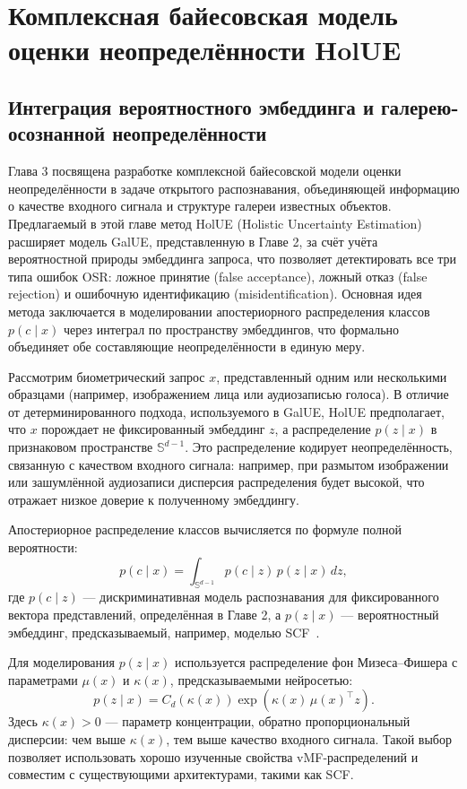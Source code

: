 \chapter{Комплексная байесовская модель оценки неопределённости HolUE}\label{ch:holue}
\section{Интеграция вероятностного эмбеддинга и галерею-осознанной неопределённости}\label{sec:holue/integration}
Глава 3 посвящена разработке комплексной байесовской модели оценки неопределённости в задаче открытого распознавания, объединяющей информацию о качестве входного сигнала и структуре галереи известных объектов.  
Предлагаемый в этой главе метод HolUE (Holistic Uncertainty Estimation) расширяет модель GalUE, представленную в Главе 2, за счёт учёта вероятностной природы эмбеддинга запроса, что позволяет детектировать все три типа ошибок OSR: ложное принятие (false acceptance), ложный отказ (false rejection) и ошибочную идентификацию (misidentification).  
Основная идея метода заключается в моделировании апостериорного распределения классов \(p(c \mid x)\) через интеграл по пространству эмбеддингов, что формально объединяет обе составляющие неопределённости в единую меру.  

Рассмотрим биометрический запрос \(x\), представленный одним или несколькими образцами (например, изображением лица или аудиозаписью голоса).  
В отличие от детерминированного подхода, используемого в GalUE, HolUE предполагает, что \(x\) порождает не фиксированный эмбеддинг \(z\), а распределение \(p(z \mid x)\) в признаковом пространстве \(\mathbb{S}^{d-1}\).  
Это распределение кодирует неопределённость, связанную с качеством входного сигнала: например, при размытом изображении или зашумлённой аудиозаписи дисперсия распределения будет высокой, что отражает низкое доверие к полученному эмбеддингу.  

Апостериорное распределение классов вычисляется по формуле полной вероятности:  
\[
p(c \mid x) = \int_{\mathbb{S}^{d-1}} p(c \mid z) \, p(z \mid x) \, dz,
\]  
где \(p(c \mid z)\) — дискриминативная модель распознавания для фиксированного вектора представлений, определённая в Главе 2, а \(p(z \mid x)\) — вероятностный эмбеддинг, предсказываемый, например, моделью SCF~\cite{scf}.  
 

Для моделирования \(p(z \mid x)\) используется распределение фон Мизеса–Фишера с параметрами \(\mu(x)\) и \(\kappa(x)\), предсказываемыми нейросетью:  
\[
p(z \mid x) = C_d(\kappa(x)) \exp\left(\kappa(x) \, \mu(x)^\top z\right).
\]  
Здесь \(\kappa(x) > 0\) — параметр концентрации, обратно пропорциональный дисперсии: чем выше \(\kappa(x)\), тем выше качество входного сигнала.  
Такой выбор позволяет использовать хорошо изученные свойства vMF-распределений и совместим с существующими архитектурами, такими как SCF.  
